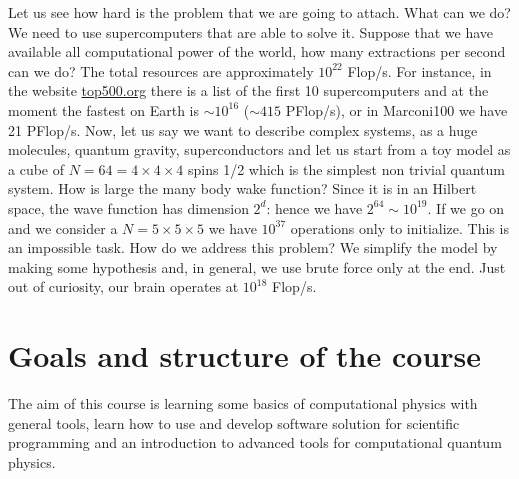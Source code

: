 \documentclass[../main/main.tex]{subfiles}
\begin{document}
Let us see how hard is the problem that we are going to attach. What can we do? We need to use supercomputers that are able to solve it. Suppose that we have available all computational power of the world, how many extractions per second can we do? The total resources are approximately \( 10^{22} \) Flop/s. For instance, in the website \url{top500.org} there is a list of the first 10 supercomputers and at the moment the fastest on Earth is \( \sim 10^{16} \) (\( \sim 415 \) PFlop/s), or in Marconi100 we have 21 PFlop/s.
Now, let us say we want to describe complex systems, as a huge molecules, quantum gravity, superconductors and let us start from a toy model as a cube of \( N = 64 = 4 \times 4 \times 4 \) spins 1/2 which is the simplest non trivial quantum system.
How is large the many body wake function? Since it is in an Hilbert space, the wave function has dimension \( 2^d \): hence we have \( 2^{64} \sim 10^{19} \). If we go on and we consider a \( N = 5 \times 5 \times 5 \) we have \( 10^{37} \) operations only to initialize. This is an impossible task. How do we address this problem? We simplify the model by making some hypothesis and, in general, we use brute force only at the end. Just out of curiosity, our brain operates at \( 10^{18} \) Flop/s.

\section{Goals and structure of the course}

The aim of this course is learning some basics of computational physics with general tools, learn how to use and develop software solution for scientific programming and an introduction to advanced tools for computational quantum physics.
\end{document}
